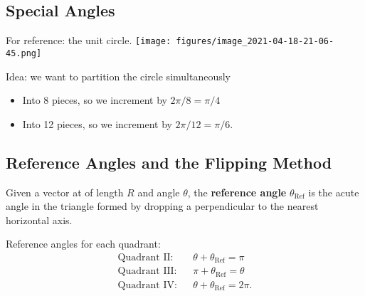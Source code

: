 \hypertarget{special-angles}{%
\subsection{Special Angles}\label{special-angles}}

For reference: the unit circle.
\texttt{[image: figures/image\_2021-04-18-21-06-45.png]}

\begin{remark}

Idea: we want to partition the circle simultaneously

\begin{itemize}
\tightlist
\item
  Into 8 pieces, so we increment by \(2\pi/8 = \pi/4\)
\item
  Into 12 pieces, so we increment by \(2\pi/12 = \pi/6\).
\end{itemize}

\end{remark}

\begin{proposition}


\end{proposition}

\hypertarget{reference-angles-and-the-flipping-method}{%
\subsection{Reference Angles and the Flipping
Method}\label{reference-angles-and-the-flipping-method}}

\begin{definition}

Given a vector at of length \(R\) and angle \(\theta\), the
\textbf{reference angle} \({ \theta_{\mathrm{Ref} } }\) is the acute
angle in the triangle formed by dropping a perpendicular to the nearest
horizontal axis.

\end{definition}

\begin{proposition}[?]

Reference angles for each quadrant:
\begin{align*}
\text{Quadrant II}: && \theta + { \theta_{\mathrm{Ref} } }= \pi \\
\text{Quadrant III}: && \pi + { \theta_{\mathrm{Ref} } }= \theta \\
\text{Quadrant IV}: && \theta + { \theta_{\mathrm{Ref} } }= 2\pi
.\end{align*}

\end{proposition}


